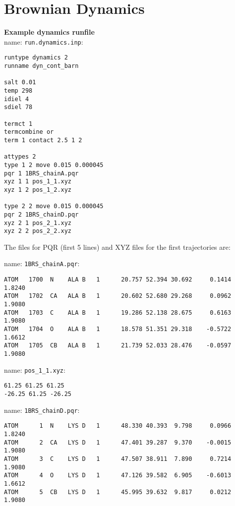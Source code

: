 \section{Brownian Dynamics}

\textbf{Example dynamics runfile} \\

name:  \texttt{run.dynamics.inp}:
\begin{lstlisting}[style = MyBash]
runtype dynamics 2
runname dyn_cont_barn

salt 0.01
temp 298
idiel 4 
sdiel 78

termct 1
termcombine or
term 1 contact 2.5 1 2

attypes 2
type 1 2 move 0.015 0.000045
pqr 1 1BRS_chainA.pqr
xyz 1 1 pos_1_1.xyz
xyz 1 2 pos_1_2.xyz

type 2 2 move 0.015 0.000045
pqr 2 1BRS_chainD.pqr
xyz 2 1 pos_2_1.xyz
xyz 2 2 pos_2_2.xyz
\end{lstlisting}
\medskip

The files for PQR (first 5 lines) and XYZ files for the first trajectories are: 

name:  \texttt{1BRS\_chainA.pqr}:
\begin{lstlisting}[style = MyBash]
ATOM   1700  N    ALA B   1      20.757 52.394 30.692     0.1414  1.8240
ATOM   1702  CA   ALA B   1      20.602 52.680 29.268     0.0962  1.9080
ATOM   1703  C    ALA B   1      19.286 52.138 28.675     0.6163  1.9080
ATOM   1704  O    ALA B   1      18.578 51.351 29.318    -0.5722  1.6612
ATOM   1705  CB   ALA B   1      21.739 52.033 28.476    -0.0597  1.9080
\end{lstlisting}

\medskip

name:  \texttt{pos\_1\_1.xyz}:
\begin{lstlisting}[style = MyBash]
61.25 61.25 61.25
-26.25 61.25 -26.25
\end{lstlisting}
\medskip

name:  \texttt{1BRS\_chainD.pqr}:
\begin{lstlisting}[style = MyBash]
ATOM      1  N    LYS D   1      48.330 40.393  9.798     0.0966  1.8240
ATOM      2  CA   LYS D   1      47.401 39.287  9.370    -0.0015  1.9080
ATOM      3  C    LYS D   1      47.507 38.911  7.890     0.7214  1.9080
ATOM      4  O    LYS D   1      47.126 39.582  6.905    -0.6013  1.6612
ATOM      5  CB   LYS D   1      45.995 39.632  9.817     0.0212  1.9080
\end{lstlisting}

